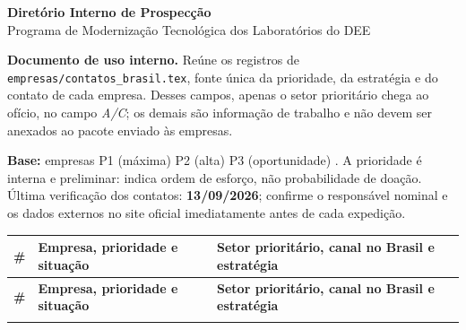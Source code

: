 \documentclass[10pt,a4paper]{article}
\makeatletter
\newcounter{contatoNum}
\newcounter{prioP1}
\newcounter{prioP2}
\newcounter{prioP3}
\newcommand{\seloPrioridade}[1]{%
  \ifcsdef{prioridade@cor@#1}{\color{\csuse{prioridade@cor@#1}}}{\color{cinzamedio}}%
  \footnotesize\sffamily\bfseries\rotuloPrioridade{#1}%
}
\newcommand{\linhaContato}[1]{%
  \stepcounter{contatoNum}%
  \thecontatoNum &
  {\bfseries\csuse{contato@#1@empresa}}\par
  {\seloPrioridade{\csuse{contato@#1@nivel}}}\par
  {\footnotesize\color{cinzamedio}\texttt{\detokenize{#1}} — \csuse{contato@#1@status}} &
  {\bfseries\csuse{contato@#1@setor}}\par
  \vspace{0.6mm}\csuse{contato@#1@canal}\par
  \vspace{0.6mm}{\footnotesize\color{cinzaescuro}\textbf{Estratégia:} \csuse{contato@#1@estrategia}}\\
  \addlinespace[1.2mm]
}
\newcommand{\resumoPrioridades}{%
  \number\value{prioP1}{} empresas P1 (máxima) \textbullet{}
  \number\value{prioP2}{} P2 (alta) \textbullet{}
  \number\value{prioP3}{} P3 (oportunidade)%
}
\makeatother
\begin{document}
\cabecalhoInstitucional

\begin{center}
{\Large\bfseries\color{azulpetroleo} Diretório Interno de Prospecção}\\[1.5mm]
{\small Programa de Modernização Tecnológica dos Laboratórios do DEE}
\end{center}

\begin{destaque}
\textbf{Documento de uso interno.} Reúne os registros de \texttt{empresas/contatos\_brasil.tex},
fonte única da prioridade, da estratégia e do contato de cada empresa. Desses campos, apenas o
setor prioritário chega ao ofício, no campo \emph{A/C}; os demais são informação de trabalho e
não devem ser anexados ao pacote enviado às empresas.

\vspace{1.2mm}
\textbf{Base:} \resumoPrioridades. A prioridade é interna e preliminar: indica ordem de esforço,
não probabilidade de doação. Última verificação dos contatos: \textbf{13/09/2026}; confirme o
responsável nominal e os dados externos no site oficial imediatamente antes de cada expedição.
\end{destaque}

\vspace{2mm}
\renewcommand{\arraystretch}{1.12}
\begin{longtable}{@{}p{} >{\RaggedRight\arraybackslash}p{} >{\RaggedRight\arraybackslash}p{}@{}}
\toprule
\textbf{\#} & \textbf{Empresa, prioridade e situação} & \textbf{Setor prioritário, canal no Brasil e estratégia}\\
\midrule
\endfirsthead
\toprule
\textbf{\#} & \textbf{Empresa, prioridade e situação} & \textbf{Setor prioritário, canal no Brasil e estratégia}\\
\midrule
\endhead
\bottomrule
\endlastfoot
\forlistloop{\linhaContato}{\listaContatos}
\end{longtable}
\end{document}
